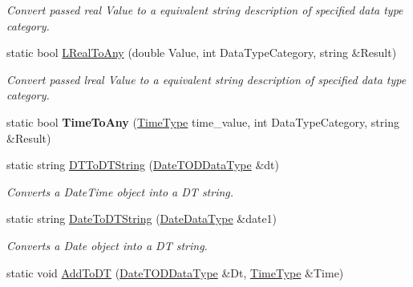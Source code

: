 \begin{DoxyCompactItemize}
\begin{DoxyCompactList}\small\item\em Convert passed real Value to a equivalent string description of specified data type category. \end{DoxyCompactList}\item 
static bool \hyperlink{classpc__emulator_1_1DataTypeUtils_a493525ae488d0d825858ea20701fd412}{L\+Real\+To\+Any} (double Value, int Data\+Type\+Category, string \&Result)\hypertarget{classpc__emulator_1_1DataTypeUtils_a493525ae488d0d825858ea20701fd412}{}\label{classpc__emulator_1_1DataTypeUtils_a493525ae488d0d825858ea20701fd412}

\begin{DoxyCompactList}\small\item\em Convert passed lreal Value to a equivalent string description of specified data type category. \end{DoxyCompactList}\item 
static bool {\bfseries Time\+To\+Any} (\hyperlink{structpc__emulator_1_1TIMEDataType}{Time\+Type} time\+\_\+value, int Data\+Type\+Category, string \&Result)\hypertarget{classpc__emulator_1_1DataTypeUtils_a6ecf82328c9a695112a69ff6b2431489}{}\label{classpc__emulator_1_1DataTypeUtils_a6ecf82328c9a695112a69ff6b2431489}

\item 
static string \hyperlink{classpc__emulator_1_1DataTypeUtils_ad9bd193c25786aea50df4b47dbd3b663}{D\+T\+To\+D\+T\+String} (\hyperlink{structpc__emulator_1_1DateTODDataType}{Date\+T\+O\+D\+Data\+Type} \&dt)\hypertarget{classpc__emulator_1_1DataTypeUtils_ad9bd193c25786aea50df4b47dbd3b663}{}\label{classpc__emulator_1_1DataTypeUtils_ad9bd193c25786aea50df4b47dbd3b663}

\begin{DoxyCompactList}\small\item\em Converts a Date\+Time object into a DT string. \end{DoxyCompactList}\item 
static string \hyperlink{classpc__emulator_1_1DataTypeUtils_a5ed4cdd86bd90996706c8c89f965f43b}{Date\+To\+D\+T\+String} (\hyperlink{structpc__emulator_1_1DateDataType}{Date\+Data\+Type} \&date1)\hypertarget{classpc__emulator_1_1DataTypeUtils_a5ed4cdd86bd90996706c8c89f965f43b}{}\label{classpc__emulator_1_1DataTypeUtils_a5ed4cdd86bd90996706c8c89f965f43b}

\begin{DoxyCompactList}\small\item\em Converts a Date object into a DT string. \end{DoxyCompactList}\item 
static void \hyperlink{classpc__emulator_1_1DataTypeUtils_a39040271d3313ca64ffd484cb76235e8}{Add\+To\+DT} (\hyperlink{structpc__emulator_1_1DateTODDataType}{Date\+T\+O\+D\+Data\+Type} \&Dt, \hyperlink{structpc__emulator_1_1TIMEDataType}{Time\+Type} \&Time)\hypertarget{classpc__emulator_1_1DataTypeUtils_a39040271d3313ca64ffd484cb76235e8}{}\label{classpc__emulator_1_1DataTypeUtils_a39040271d3313ca64ffd484cb76235e8}


\end{DoxyCompactItemize}
